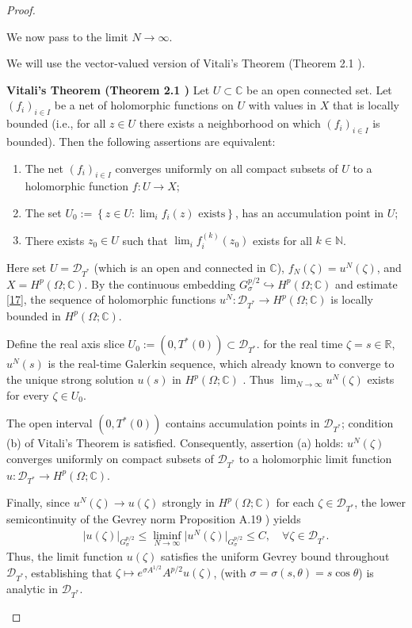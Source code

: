 \documentclass[12pt]{article}
\theoremstyle{plain}
\theoremstyle{remark}
\begin{document}
\begin{proof}
\begin{enumerate}
We now pass to the limit $N \to\infty$.  

We will use the vector-valued version of Vitali’s Theorem (Theorem 2.1 \cite{arendt_nikolski_2000}).


\textbf{Vitali’s Theorem (Theorem 2.1 \cite{arendt_nikolski_2000})}
Let $U\subset\mathbb{C}$ be an open connected set. Let $(f_i)_{i \in I}$ be a net of holomorphic functions on $U$ with values in $X$ that is locally bounded (i.e., for all $z \in U$ there exists a neighborhood on which $(f_i)_{i \in I}$ is bounded).
Then the following assertions are equivalent:
\begin{enumerate}
    \item The net $(f_i)_{i \in I}$ converges uniformly on all compact subsets of $U$ to a holomorphic function $f : U \to X$;
    \item The set 
    \(
    U_0 := \left\{ z \in U : \lim_{i} f_i(z) \text{ exists} \right\}
    \),
    has an accumulation point in $U$;
    \item There exists $z_0 \in U$ such that $\lim_{i} f_i^{(k)}(z_0)$ exists for all $k \in \mathbb{N}$.
\end{enumerate}

Here set $U=\mathcal{D}_{T^*}$ (which is an open and connected in $\mathbb{C}$), $f_N(\zeta)=u^N(\zeta)$, and $X=H^{p}(\Omega;\mathbb{C})$. By the continuous embedding $G_{\sigma}^{p/2} \hookrightarrow H^{p}(\Omega;\mathbb{C}) $ and estimate \eqref{17}, the sequence of holomorphic functions $u^N: \mathcal{D}_{T^*} \to H^{p}(\Omega;\mathbb{C}) $ is locally bounded in $H^{p}(\Omega;\mathbb{C})$. 

Define the real axis slice $U_0:=(0, T^*(0))\subset \mathcal{D}_{T^*}$. for the real time $\zeta=s\in \mathbb{R}$, $u^N(s)$ is the real-time Galerkin sequence, which already known to converge to the unique strong solution $u(s)$ in $H^{p}(\Omega;\mathbb{C})$ \cite{FerrariTiti1998}. Thus $\lim_{N \to \infty}
 u^N(\zeta) $ exists for every $\zeta\in U_0$. 
 
The open interval $(0, T^*(0))$ contains accumulation points in $\mathcal{D}_{T^*}$; condition (b) of Vitali’s Theorem is satisfied. Consequently, assertion (a) holds: $u^N(\zeta)$ converges uniformly on compact subsets of $\mathcal{D}_{T^*}$ to a holomorphic limit function $u: \mathcal{D}_{T^*}\to H^{p}(\Omega;\mathbb{C})$.
 
 Finally, since $u^N(\zeta) \to u(\zeta)$ strongly in $H^p(\Omega;\mathbb{C})$ for each $\zeta \in \mathcal{D}_{T^*}$, the lower semicontinuity of the Gevrey norm Proposition A.19 \cite{RobinsonRodrigoSadowski2016}) yields
\begin{align}
\lvert u(\zeta) \rvert_{G_{\sigma}^{p/2}}
\le \liminf_{N \to \infty}
\lvert u^N(\zeta) \rvert_{G_{\sigma}^{p/2}}
\le C,\quad \forall \zeta \in \mathcal{D}_{T^*}.\label{18}
 \end{align}
Thus, the limit function $u(\zeta)$ satisfies the uniform Gevrey bound throughout $\mathcal{D}_{T^*}$, establishing that 
\(
\zeta \longmapsto e^{\sigma A^{1/2}} A^{p/2} u(\zeta)\), (with  $\sigma = \sigma(s,\theta) = s\cos\theta$)
is analytic in $\mathcal{D}_{T^*}$.



\end{enumerate}
\end{proof}
\end{document}
